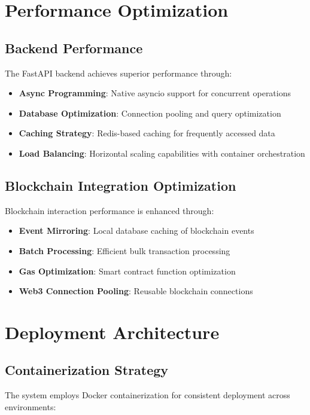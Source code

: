 \documentclass[12pt,a4paper]{article}
\begin{document}
\section{Performance Optimization}

\subsection{Backend Performance}
The FastAPI backend achieves superior performance through:

\begin{itemize}
    \item \textbf{Async Programming}: Native asyncio support for concurrent operations
    \item \textbf{Database Optimization}: Connection pooling and query optimization
    \item \textbf{Caching Strategy}: Redis-based caching for frequently accessed data
    \item \textbf{Load Balancing}: Horizontal scaling capabilities with container orchestration
\end{itemize}

\subsection{Blockchain Integration Optimization}
Blockchain interaction performance is enhanced through:

\begin{itemize}
    \item \textbf{Event Mirroring}: Local database caching of blockchain events
    \item \textbf{Batch Processing}: Efficient bulk transaction processing
    \item \textbf{Gas Optimization}: Smart contract function optimization
    \item \textbf{Web3 Connection Pooling}: Reusable blockchain connections
\end{itemize}

\section{Deployment Architecture}

\subsection{Containerization Strategy}
The system employs Docker containerization for consistent deployment across environments:
\end{document}
